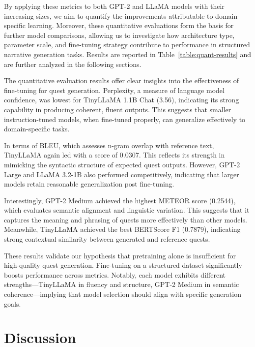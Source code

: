 By applying these metrics to both GPT-2 and LLaMA models with their increasing
sizes, we aim to quantify the improvements attributable to domain-specific learning.
Moreover, these quantitative evaluations form the basis for further model comparisons,
allowing us to investigate how architecture type, parameter scale, and fine-tuning strategy
contribute to performance in structured narrative generation tasks. Results are reported
in Table~\ref{table:quant-results} and are further analyzed in the following sections.

The quantitative evaluation results offer clear insights into the effectiveness of fine-tuning
for quest generation. Perplexity, a measure of language model confidence, was lowest
for TinyLLaMA 1.1B Chat (3.56), indicating its strong capability in producing
coherent, fluent outputs. This suggests that smaller instruction-tuned models, when fine-tuned
properly, can generalize effectively to domain-specific tasks.

In terms of BLEU, which assesses n-gram overlap with reference text, TinyLLaMA
again led with a score of 0.0307. This reflects its strength in mimicking the syntactic
structure of expected quest outputs. However, GPT-2 Large and LLaMA 3.2-1B also
performed competitively, indicating that larger models retain reasonable generalization
post fine-tuning.

Interestingly, GPT-2 Medium achieved the highest METEOR score (0.2544), which
evaluates semantic alignment and linguistic variation. This suggests that it captures the
meaning and phrasing of quests more effectively than other models. Meanwhile, TinyLLaMA
achieved the best BERTScore F1 (0.7879), indicating strong contextual similarity
between generated and reference quests.

These results validate our hypothesis that pretraining alone is insufficient for high-quality
quest generation. Fine-tuning on a structured dataset significantly boosts performance
across metrics. Notably, each model exhibits different strengths—TinyLLaMA
in fluency and structure, GPT-2 Medium in semantic coherence—implying that model
selection should align with specific generation goals.

\section{Discussion}

